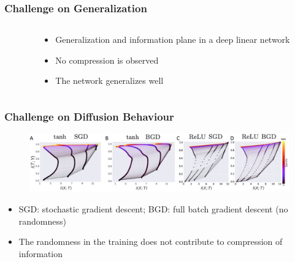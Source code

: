 \documentclass{beamer}
\begin{document}
\begin{frame}
    \frametitle{Challenge on Generalization}
    \begin{columns}
        \begin{column}{0.5\textwidth}
        \end{column}
        \begin{column}{0.5\textwidth}
            \begin{itemize}
                \item Generalization and information plane in a deep linear network
                \item No compression is observed
                \item The network generalizes well
            \end{itemize}
        \end{column}
    \end{columns}
\end{frame}

\begin{frame}
    \frametitle{Challenge on Diffusion Behaviour}
    \begin{figure}
        \centering
        \includegraphics[width=12cm]{BGD.jpg}
    \end{figure}
    \begin{itemize}
        \item SGD: stochastic gradient descent; BGD: full batch gradient descent (no randomness)
        \item The randomness in the training does not contribute to compression of information
    \end{itemize}
    

\end{frame}
\end{document}
